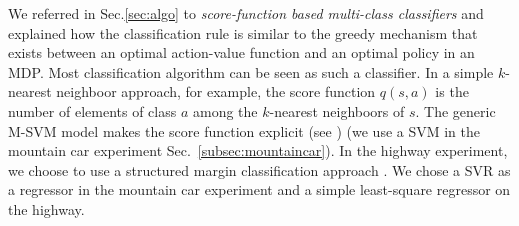 \documentclass{llncs}
\begin{document}
We referred in Sec.\ref{sec:algo} to \emph{score-function based multi-class classifiers} and explained how the classification rule is similar to the greedy mechanism that exists between an optimal action-value function and an optimal policy in an MDP. Most classification algorithm can be seen as such a classifier. In a simple $k$-nearest neighboor approach, for example, the score function $q(s,a)$ is the number of elements of class $a$ among the $k$-nearest neighboors of $s$. The generic M-SVM model makes the score function explicit (see \cite{guermeur2011generic}) (we use a SVM in the mountain car experiment Sec.~\ref{subsec:mountaincar}). In the highway experiment, we choose to use a structured margin classification approach \cite{taskar2005learning}.
We chose a SVR as a regressor in the mountain car experiment and a simple least-square regressor on the highway.
\end{document}
